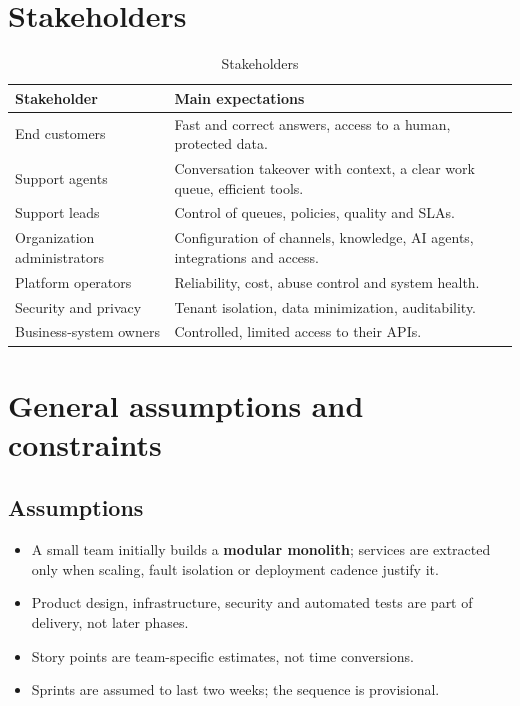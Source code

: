 \section{Stakeholders}
\begin{table}[htbp]
\centering\caption{Stakeholders}\label{tab:stakeholders}
\begin{tabular}{@{}p{4.1cm}p{11.9cm}@{}}
\toprule \textbf{Stakeholder} & \textbf{Main expectations} \\ \midrule
End customers & Fast and correct answers, access to a human, protected data. \\
Support agents & Conversation takeover with context, a clear work queue, efficient tools. \\
Support leads & Control of queues, policies, quality and SLAs. \\
Organization administrators & Configuration of channels, knowledge, AI agents, integrations and access. \\
Platform operators & Reliability, cost, abuse control and system health. \\
Security and privacy & Tenant isolation, data minimization, auditability. \\
Business-system owners & Controlled, limited access to their APIs. \\
\bottomrule
\end{tabular}
\end{table}

\section{General assumptions and constraints}
\subsection{Assumptions}
\begin{itemize}
  \item A small team initially builds a \textbf{modular monolith}; services are extracted only when scaling, fault isolation or deployment cadence justify it.
  \item Product design, infrastructure, security and automated tests are part of delivery, not later phases.
  \item Story points are team-specific estimates, not time conversions.
  \item Sprints are assumed to last two weeks; the sequence is provisional.
\end{itemize}

